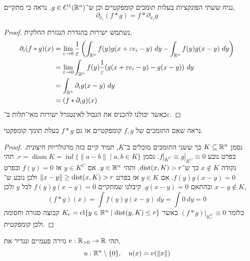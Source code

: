 \subquestion{}
נניח ששתי הפונקציות בעלות תומכים קומפקטיים וכן ש־$g \in C^1(\mathbb{R}^n)$.
נראה כי מתקיים,
\[
	\partial_{x_i} (f * g)
	= f * \partial_{x_i} g
\]
\begin{proof}
	נשתמש ישירות בהגדרת הנגזרת החלקית,
	\begin{align*}
		\partial_i (f * g)(x)
		& = \lim_{\varepsilon \to 0} \frac{1}{\varepsilon} \left(\int_{\mathbb{R}^n} f(y) g(x + \varepsilon e_i - y)\ dy - \int_{\mathbb{R}^n} f(y) g(x - y)\ dy\right) \\
		& = \lim_{\varepsilon \to 0} \int_{\mathbb{R}^n} f(y) \frac{1}{\varepsilon} (g(x + \varepsilon e_i - y) - g(x - y))\ dy \\
		& = \int_{\mathbb{R}^n} \partial_i g(x - y)\ dy \\
		& = (f * \partial_i g)(x)
	\end{align*}
	כאשר יכולנו להכניס את הגבול לאינטגרל ישירות מאי־תלות ב־$\varepsilon$.
\end{proof}

\subquestion{}
נראה שאם התומכים של $f, g$ קומפקטיים אז גם $f * g$ בעלת תומך קומפקטי.
\begin{proof}
	נסמן $K \subseteq \mathbb{R}^n$ כך ששני התומכים מוכלים ב־$K$, תמיד קיים כזה מרגולריות חיצונית.
	בפרט נובע $f |_{K^C} \equiv g |_{K^C} \equiv 0$.
	נסמן $r = \operatorname{diam} K = \inf\{ \lVert a - b \rVert \mid a, b \in K \}$.
	תהי נקודה $x \notin K$ כך ש־$\operatorname{dist}(x, K) > r$, ותהי $y \in \mathbb{R}^n$.
	אם $y \in K^C$ אז $f(y) = 0$ ובפרט $f(y) g(x - y) = 0$.
	אם $y \in K$ אז בפרט $\lVert x - y \rVert \ge \operatorname{dist}(x, K) > r$ ולכן נובע ש־$x - y \notin K$ ובהתאם $g(x - y) = 0$.
	קיבלנו שמתקיים $f(y) g(x - y) = 0$ לכל $y$ ולכן,
	\[
		(f * g)(x)
		= \int f(y) g(x - y)\ dy
		= \int 0\ dy
		= 0
	\]
	כלומר $(f * g) |_{K_r^C} \equiv 0$ כאשר $K_r = \operatorname{cl} \{ y \in \mathbb{R}^n \mid \operatorname{dist}(y, K) \le r \}$ קבוצה סגורה וחסומה ולכן קומפקטית.
\end{proof}

\question{}
תהי $v : \mathbb{R}_{> 0} \to \mathbb{R}$ גזירה פעמיים ונגדיר את,
\[
	u : \mathbb{R}^n \setminus \{ 0 \},
	\quad
	u(x)
	= v(\lVert x \rVert)
\]

